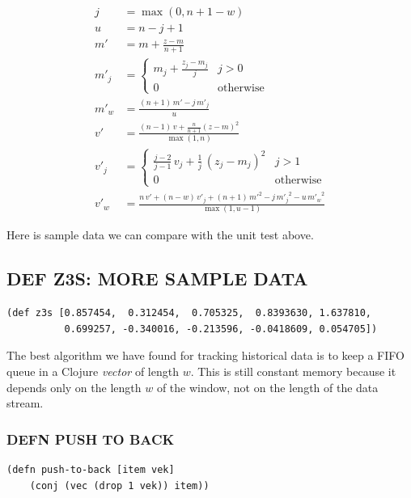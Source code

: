 \documentclass[10pt,oneside,x11names]{article}
\begin{document}
\begin{align*}
j     &= \max(0,n+1-w)               \\
u     &= n-j+1                       \\
m'    &= m+\frac{z-m}{n+1}           \\
m'_j  &= \begin{cases}
  m_j+\frac{z_j-m_j}{j} & j>0        \\
  0 & \mathrm{otherwise}
\end{cases}                          \\
m'_w  &= \frac{(n+1)\,m'-j\,m'_j}{u} \\
v'    &= \frac{(n-1)\,v+\frac{n}{n+1}\left(z-m\right)^2}{\max(1,n)}   \\
v'_j  &= \begin{cases}
  \frac{j-2}{j-1}\,v_j+\frac{1}{j}\,\left(z_j-m_j\right)^2 & j>1      \\
  0 & \mathrm{otherwise}
\end{cases}                                                           \\
v'_w  &= \frac{n\,v'+(n-w)\,v'_j+(n+1)\,{m'}^2-j\,{m'_j}^2-u\,{m'_w}^2}{\max(1,u-1)}
\end{align*}

Here is sample data we can compare with the unit test above.

\subsection{DEF Z3S: MORE SAMPLE DATA}
\label{sec:org8f093e7}
\begin{verbatim}
(def z3s [0.857454,  0.312454,  0.705325,  0.8393630, 1.637810,
          0.699257, -0.340016, -0.213596, -0.0418609, 0.054705])
\end{verbatim}

The best algorithm we have found for tracking historical data is to keep
a FIFO queue in a Clojure \emph{vector} of length \(w\). This is still constant
memory because it depends only on the length \(w\) of the window, not on
the length of the data stream.

\subsubsection{DEFN PUSH TO BACK}
\label{sec:orgb0aedc1}

\begin{verbatim}
(defn push-to-back [item vek]
    (conj (vec (drop 1 vek)) item))
\end{verbatim}
\end{document}
